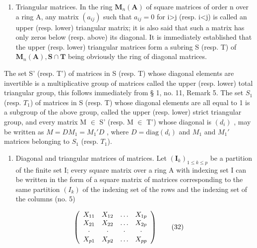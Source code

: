 \begin{enumerate}
\def\labelenumi{\Roman{enumi}.}
\setcounter{enumi}{2}
\tightlist
\item
  Triangular matrices. In the ring \(\mathbf{M}_{n}(\mathbf{A})\) of square matrices of order n over a ring A, any matrix \((a_{ij})\) such that \(a_{ij}=0\) for i\textgreater j (resp. i\textless j) is called an upper (resp. lower) triangular matrix; it is also said that such a matrix has only zeros below (resp. above) its diagonal. It is immediately established that the upper (resp. lower) triangular matrices form a subring S (resp. T) of \(\mathbf{M}_{n}(\mathbf{A}),\mathbf{S}\cap\mathbf{T}\) being obviously the ring of diagonal matrices.
\end{enumerate}

The set S' (resp. T') of matrices in S (resp. T) whose diagonal elements are invertible is a multiplicative group of matrices called the upper (resp. lower) total triangular group, this follows immediately from § 1, no. 11, Remark 5. The set \(S_{1}\) (resp. \(T_{1}\)) of matrices in S (resp. T) whose diagonal elements are all equal to 1 is a subgroup of the above group, called the upper (resp. lower) strict triangular group, and every matrix M \ensuremath{\in} S' (resp. M \ensuremath{\in} T') whose diagonal is \((d_{i})\) , may be written as \(M = DM_{1} = M_{1}'D\) , where \(D = \mathrm{diag}(d_{i})\) and \(M_{1}\) and \(M_{1}'\) matrices belonging to \(S_{1}\) (resp. \(T_{1}\)).

\begin{enumerate}
\def\labelenumi{\Roman{enumi}.}
\setcounter{enumi}{3}
\tightlist
\item
  Diagonal and triangular matrices of matrices. Let \((\mathbf{I}_k)_{1 \leqslant k \leqslant p}\) be a partition of the finite set I; every square matrix over a ring A with indexing set I can be written in the form of a square matrix of matrices corresponding to the same partition \((I_{k})\) of the indexing set of the rows and the indexing set of the columns (no. 5)
\end{enumerate}

\[
\left( \begin{array}{c c c c} X _ {1 1} & X _ {1 2} & \ldots & X _ {1 p} \\ X _ {2 1} & X _ {2 2} & \ldots & X _ {2 p} \\ \cdot & \cdot & \cdot & \cdot \\ X _ {p 1} & X _ {p 2} & \ldots & X _ {p p} \end{array} \right)\tag{32}
\]


